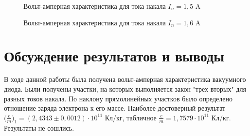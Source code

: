 \documentclass[a4paper,12pt]{article}
\begin{document}
\begin{figure} 
	\centering
	\caption{Вольт-амперная характеристика для тока накала $I_n = 1,5$ A}
	\label{mah}
\end{figure}

\begin{figure} 
	\centering
	\caption{Вольт-амперная характеристика для тока накала $I_n = 1,6$ A}
	\label{mah}
\end{figure}

\section{Обсуждение результатов и выводы}
\par В ходе данной работы была получена вольт-амперная характеристика вакуумного диода. Были получены участки, на которых выполняется закон "трех вторых" для разных токов накала. По наклону прямолинейных участков было определено отношение заряда электрона к его массе. Наиболее достоверный результат $\big(\frac{e}{m}\big)_1 = (2,4343 \pm 0,0012) \cdot 10^{11}$ Кл/кг, табличное  $\frac{e}{m} = 1,7579 \cdot 10^{11}$ Кл/кг. Результаты не сошлись.
\end{document}
